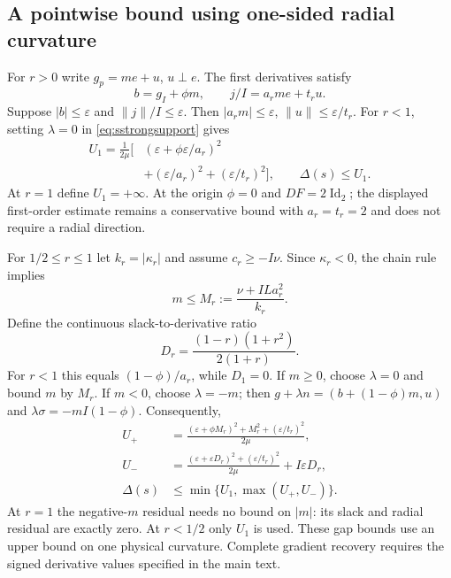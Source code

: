 \documentclass[10pt,a4paper]{article}
\begin{document}
\subsection{A pointwise bound using one-sided radial curvature}
For $r>0$ write $g_p=me+u$, $u\perp e$. The first derivatives satisfy
\begin{equation}
 b=g_I+\phi m,\qquad j/I=a_rm e+t_ru.
 \label{eq:sstopdecomposition}
\end{equation}
Suppose $|b|\le\varepsilon$ and $\|j\|/I\le\varepsilon$. Then $|a_rm|\le\varepsilon$, $\|u\|\le\varepsilon/t_r$. For $r<1$, setting $\lambda=0$ in \eqref{eq:sstrongsupport} gives
\begin{equation}
 \begin{aligned}
 U_1=\frac1{2\mu}\bigl[&(\varepsilon+\phi\varepsilon/a_r)^2\\
              &+(\varepsilon/a_r)^2+(\varepsilon/t_r)^2\bigr],\qquad
 \Delta(s)\le U_1.
 \end{aligned}
 \label{eq:sstopfirst}
\end{equation}
At $r=1$ define $U_1=+\infty$. At the origin $\phi=0$ and $DF=2\operatorname{Id}_2$; the displayed first-order estimate remains a conservative bound with $a_r=t_r=2$ and does not require a radial direction.

For $1/2\le r\le1$ let $k_r=|\kappa_r|$ and assume $c_r\ge-I\nu$. Since $\kappa_r<0$, the chain rule implies
\begin{equation}
 m\le M_r:=\frac{\nu+ILa_r^2}{k_r}.
 \label{eq:sstopmplus}
\end{equation}
Define the continuous slack-to-derivative ratio
\begin{equation}
 D_r=\frac{(1-r)(1+r^2)}{2(1+r)}.
 \label{eq:sstopD}
\end{equation}
For $r<1$ this equals $(1-\phi)/a_r$, while $D_1=0$. If $m\ge0$, choose $\lambda=0$ and bound $m$ by $M_r$. If $m<0$, choose $\lambda=-m$; then $g+\lambda n=(b+(1-\phi)m,u)$ and $\lambda\sigma=-mI(1-\phi)$. Consequently,
\begin{equation}
 \begin{aligned}
 U_+&=\frac{(\varepsilon+\phi M_r)^2+M_r^2+(\varepsilon/t_r)^2}{2\mu},\\
 U_-&=\frac{(\varepsilon+\varepsilon D_r)^2+(\varepsilon/t_r)^2}{2\mu}
             +I\varepsilon D_r,\\
 \Delta(s)&\le\min\{U_1,\max(U_+,U_-)\}.
 \end{aligned}
 \label{eq:sstoplocal}
\end{equation}
At $r=1$ the negative-$m$ residual needs no bound on $|m|$: its slack and radial residual are exactly zero. At $r<1/2$ only $U_1$ is used. These gap bounds use an upper bound on one physical curvature. Complete gradient recovery requires the signed derivative values specified in the main text.
\end{document}
